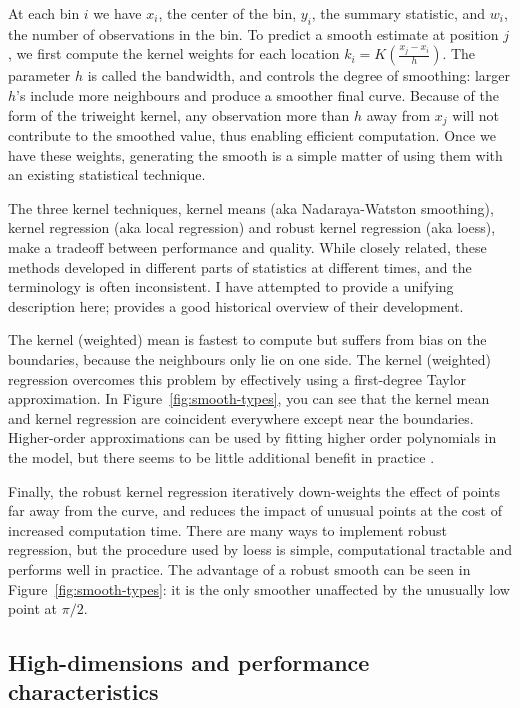 \documentclass[journal]{vgtc}                %
\begin{document}
At each bin $i$ we have $x_i$, the center of the bin, $y_i$, the summary statistic, and $w_i$, the number of observations in the bin. To predict a smooth estimate at position $j$, we first compute the kernel weights for each location $k_i = K(\frac{x_j - x_i}{h})$. The parameter $h$ is called the bandwidth, and controls the degree of smoothing: larger $h$'s include more neighbours and produce a smoother final curve. Because of the form of the triweight kernel, any observation more than $h$ away from $x_j$ will not contribute to the smoothed value, thus enabling efficient computation.  Once we have these weights, generating the smooth is a simple matter of using them with an existing statistical technique.

The three kernel techniques, kernel means (aka Nadaraya-Watston smoothing), kernel regression (aka local regression) and robust kernel regression (aka loess), make a tradeoff between performance and quality. While closely related, these methods developed in different parts of statistics at different times, and the terminology is often inconsistent. I have attempted to provide a unifying description here; \citep{cleveland:1996} provides a good historical overview of their development.

The kernel (weighted) mean is fastest to compute but suffers from bias on the boundaries, because the neighbours only lie on one side. The kernel (weighted) regression overcomes this problem by effectively using a first-degree Taylor approximation. In Figure~\ref{fig:smooth-types}, you can see that the kernel mean and kernel regression are coincident everywhere except near the boundaries. Higher-order approximations can be used by fitting higher order polynomials in the model, but there seems to be little additional benefit in practice \citep{cleveland:1996}.

Finally, the robust kernel regression iteratively down-weights the effect of points far away from the curve, and reduces the impact of unusual points at the cost of increased computation time. There are many ways to implement robust regression, but the procedure used by loess \citep{cleveland:1979} is simple, computational tractable and performs well in practice. The advantage of a robust smooth can be seen in Figure~\ref{fig:smooth-types}: it is the only smoother unaffected by the unusually low point at $\pi / 2$.

\subsection{High-dimensions and performance characteristics}
\end{document}
